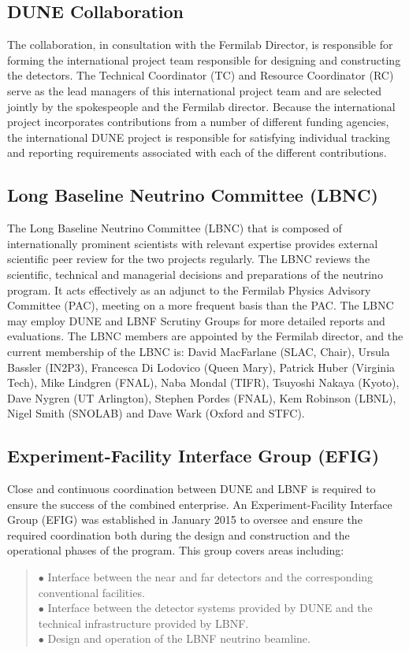 \subsection{DUNE Collaboration}	

The collaboration, in consultation with the Fermilab Director,
is responsible for forming the international project team responsible
for designing and constructing the detectors.  The Technical Coordinator
(TC) and Resource Coordinator (RC) serve as the lead managers
of this international project team and are selected jointly by
the spokespeople and the Fermilab director.  Because the international
project incorporates contributions from a number of different
funding agencies, the international DUNE project is responsible for
satisfying individual tracking and reporting requirements associated
with each of the different contributions.

\subsection{Long Baseline Neutrino Committee (LBNC)}

The Long Baseline Neutrino Committee (LBNC) that is composed
of internationally prominent scientists with relevant expertise
provides external scientific peer review for the two projects regularly.
The LBNC reviews the scientific, technical and managerial
decisions and preparations of the neutrino program.
It acts effectively as an adjunct to the Fermilab Physics Advisory Committee
(PAC), meeting on a more frequent basis than the PAC.
The LBNC may employ DUNE and LBNF Scrutiny Groups for more
detailed reports and evaluations. The LBNC members are appointed by the
Fermilab director, and the current membership of the LBNC is:
David MacFarlane (SLAC, Chair),
Ursula Bassler (IN2P3),
Francesca Di Lodovico (Queen Mary),
Patrick Huber (Virginia Tech),
Mike Lindgren (FNAL),
Naba Mondal (TIFR),
Tsuyoshi Nakaya (Kyoto),
Dave Nygren (UT Arlington),
Stephen Pordes (FNAL),
Kem Robinson (LBNL),
Nigel Smith (SNOLAB) and
Dave Wark (Oxford and STFC).

\subsection{Experiment-Facility Interface Group (EFIG)}

Close and continuous coordination between DUNE and LBNF is
required to ensure the success of the combined enterprise.
An Experiment-Facility Interface Group (EFIG) was established
in January 2015 to oversee and ensure the required coordination
both during the design and construction and the operational
phases of the program. This group covers areas including:
\begin{quote}
$\bullet$ Interface between the near and far detectors and the
corresponding conventional facilities.\\
$\bullet$ Interface between the detector systems provided by
DUNE and the technical infrastructure provided by LBNF.\\
$\bullet$ Design and operation of the LBNF neutrino beamline.
\end{quote}

